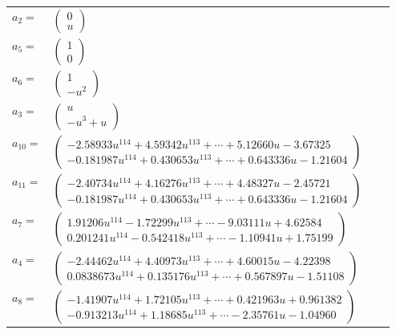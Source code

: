 \documentclass[1p]{elsarticle_modified}
\theoremstyle{definition}
\begin{document}
\begin{tabular}{m{7pt} m{180pt} m{7pt} m{180pt} }
\flushright $a_{2}=$&$\begin{pmatrix}0\\u\end{pmatrix}$ \\
\flushright $a_{5}=$&$\begin{pmatrix}1\\0\end{pmatrix}$ \\
\flushright $a_{6}=$&$\begin{pmatrix}1\\- u^2\end{pmatrix}$ \\
\flushright $a_{3}=$&$\begin{pmatrix}u\\- u^3+u\end{pmatrix}$ \\
\flushright $a_{10}=$&$\begin{pmatrix}-2.58933 u^{114}+4.59342 u^{113}+\cdots+5.12660 u-3.67325\\-0.181987 u^{114}+0.430653 u^{113}+\cdots+0.643336 u-1.21604\end{pmatrix}$ \\
\flushright $a_{11}=$&$\begin{pmatrix}-2.40734 u^{114}+4.16276 u^{113}+\cdots+4.48327 u-2.45721\\-0.181987 u^{114}+0.430653 u^{113}+\cdots+0.643336 u-1.21604\end{pmatrix}$ \\
\flushright $a_{7}=$&$\begin{pmatrix}1.91206 u^{114}-1.72299 u^{113}+\cdots-9.03111 u+4.62584\\0.201241 u^{114}-0.542418 u^{113}+\cdots-1.10941 u+1.75199\end{pmatrix}$ \\
\flushright $a_{4}=$&$\begin{pmatrix}-2.44462 u^{114}+4.40973 u^{113}+\cdots+4.60015 u-4.22398\\0.0838673 u^{114}+0.135176 u^{113}+\cdots+0.567897 u-1.51108\end{pmatrix}$ \\
\flushright $a_{8}=$&$\begin{pmatrix}-1.41907 u^{114}+1.72105 u^{113}+\cdots+0.421963 u+0.961382\\-0.913213 u^{114}+1.18685 u^{113}+\cdots-2.35761 u-1.04960\end{pmatrix}$ \\

\end{tabular}
\end{document}
